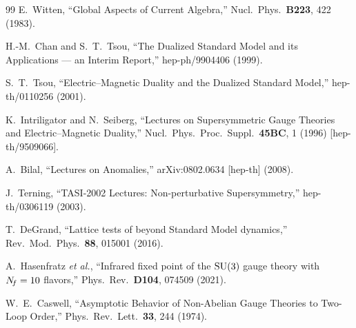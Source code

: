 \documentclass[11pt,a4paper]{article}
\begin{document}
\begin{thebibliography}{99}
  E.~Witten,
  ``Global Aspects of Current Algebra,''
  Nucl.\ Phys.\ \textbf{B223}, 422 (1983).

  H.-M.~Chan and S.~T.~Tsou,
  ``The Dualized Standard Model and its Applications --- an Interim Report,''
  hep-ph/9904406 (1999).

  S.~T.~Tsou,
  ``Electric--Magnetic Duality and the Dualized Standard Model,''
  hep-th/0110256 (2001).

  K.~Intriligator and N.~Seiberg,
  ``Lectures on Supersymmetric Gauge Theories and Electric--Magnetic
  Duality,''
  Nucl.\ Phys.\ Proc.\ Suppl.\ \textbf{45BC}, 1 (1996)
  [hep-th/9509066].

  A.~Bilal,
  ``Lectures on Anomalies,''
  arXiv:0802.0634 [hep-th] (2008).

  J.~Terning,
  ``TASI-2002 Lectures: Non-perturbative Supersymmetry,''
  hep-th/0306119 (2003).

  T.~DeGrand,
  ``Lattice tests of beyond Standard Model dynamics,''
  Rev.\ Mod.\ Phys.\ \textbf{88}, 015001 (2016).

  A.~Hasenfratz \textit{et al.},
  ``Infrared fixed point of the $\mathrm{SU}(3)$ gauge theory with $N_{\!f}=10$
  flavors,''
  Phys.\ Rev.\ \textbf{D104}, 074509 (2021).

  W.~E.~Caswell,
  ``Asymptotic Behavior of Non-Abelian Gauge Theories to Two-Loop Order,''
  Phys.\ Rev.\ Lett.\ \textbf{33}, 244 (1974).

\end{thebibliography}
\end{document}
